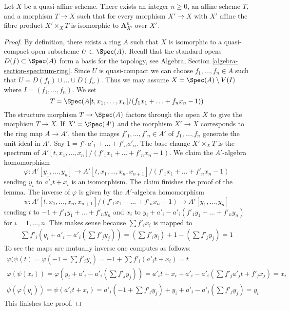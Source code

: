 \begin{lemma}
\label{lemma-quasi-affine-presentation}
Let $X$ be a quasi-affine scheme. There exists an integer $n \geq 0$,
an affine scheme $T$, and a morphism $T \to X$ such that for every
morphism $X' \to X$ with $X'$ affine the fibre product $X' \times_X T$
is isomorphic to $\mathbf{A}^n_{X'}$ over $X'$.
\end{lemma}

\begin{proof}
By definition, there exists a ring $A$ such that $X$ is isomorphic to a
quasi-compact open subscheme $U \subset \Spec(A)$. Recall that the standard
opens $D(f) \subset \Spec(A)$ form a basis for the topology, see
Algebra, Section \ref{algebra-section-spectrum-ring}. Since $U$ is
quasi-compact we can choose $f_1, \ldots, f_n \in A$ such that
$U = D(f_1) \cup \ldots \cup D(f_n)$. Thus we may assume
$X = \Spec(A) \setminus V(I)$ where $I = (f_1, \ldots, f_n)$. We set
$$
T = \Spec(A[t, x_1, \ldots, x_n]/(f_1 x_1 + \ldots + f_n x_n - 1))
$$
The structure morphism $T \to \Spec(A)$ factors through the open $X$
to give the morphism $T \to X$. If $X' = \Spec(A')$ and the morphism
$X' \to X$ corresponds to the ring map $A \to A'$, then the images
$f'_1, \ldots, f'_n \in A'$ of $f_1, \ldots, f_n$
generate the unit ideal in $A'$.
Say $1 = f'_1 a'_1 + \ldots + f'_n a'_n$.
The base change $X' \times_X T$ is the spectrum of
$A'[t, x_1, \ldots, x_n]/(f'_1 x_1 + \ldots + f'_n x_n - 1)$.
We claim the $A'$-algebra homomorphism
$$
\varphi :
A'[y_1, \ldots, y_n]
\longrightarrow
A'[t, x_1, \ldots, x_n, x_{n + 1}]/(f'_1 x_1 + \ldots + f'_n x_n - 1)
$$
sending $y_i$ to $a'_i t + x_i$ is an isomorphism. The claim finishes
the proof of the lemma. The inverse of $\varphi$ is given by the $A'$-algebra
homomorphism
$$
\psi :
A'[t, x_1, \ldots, x_n, x_{n + 1}]/(f'_1 x_1 + \ldots + f'_n x_n - 1)
\longrightarrow
A'[y_1, \ldots, y_n]
$$
sending $t$ to $-1 + f'_1 y_1 + \ldots + f'_n y_n$ and $x_i$ to
$y_i + a'_i - a'_i(f'_1 y_1 + \ldots + f'_n y_n)$ for $i = 1, \ldots, n$.
This makes sense because $\sum f'_ix_i$ is mapped to
$$
\begin{matrix}
\sum f'_i(y_i + a'_i - a'_i(\sum f'_j y_j)) =
(\sum f'_iy_i) + 1 - (\sum f'_j y_j) = 1
\end{matrix}
$$
To see the maps are mutually inverse one computes as follows:
$$
\begin{matrix}
\varphi(\psi(t) = \varphi(-1 +  \sum f'_i y_i) =
-1 + \sum f'_i (a'_i t + x_i) = t \\
\varphi(\psi(x_i)) = \varphi(y_i + a'_i - a'_i(\sum f'_j y_j)) =
a'_i t + x_i + a'_i - a'_i(\sum f'_ja'_jt + f'_jx_j) = x_i \\
\psi(\varphi(y_i)) = \psi(a'_i t + x_i) =
a'_i(-1 + \sum f'_j y_j) + y_i + a'_i - a'_i(\sum f'_j y_j) = y_i
\end{matrix}
$$
This finishes the proof.
\end{proof}




